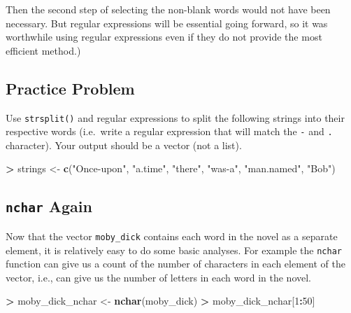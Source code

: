 \documentclass[
]{krantz}
\makeatletter
\newenvironment{Shaded}{\begin{snugshade}}{\end{snugshade}}
\newcommand{\DecValTok}[1]{\textcolor[rgb]{0.06,0.06,0.06}{#1}}
\newcommand{\KeywordTok}[1]{\textcolor[rgb]{0.27,0.27,0.27}{\textbf{#1}}}
\newcommand{\NormalTok}[1]{#1}
\newcommand{\OperatorTok}[1]{\textcolor[rgb]{0.43,0.43,0.43}{\textbf{#1}}}
\newcommand{\StringTok}[1]{\textcolor[rgb]{0.5,0.5,0.5}{#1}}
\newenvironment{kframe}{%
\medskip{}
\setlength{\fboxsep}{.8em}
 \def\at@end@of@kframe{}%
 \ifinner\ifhmode%
  \def\at@end@of@kframe{\end{minipage}}%
  \begin{minipage}{\columnwidth}%
 \fi\fi%
 \def\FrameCommand##1{\hskip\@totalleftmargin \hskip-\fboxsep
 \colorbox{shadecolor}{##1}\hskip-\fboxsep
     \hskip-\linewidth \hskip-\@totalleftmargin \hskip\columnwidth}%
 \MakeFramed {\advance\hsize-\width
   \@totalleftmargin\z@ \linewidth\hsize
   \@setminipage}}%
 {\par\unskip\endMakeFramed%
 \at@end@of@kframe}
\renewenvironment{Shaded}{\begin{kframe}}{\end{kframe}}
\makeatother
\begin{document}
Then the second step of selecting the non-blank words would not have been necessary. But regular expressions will be essential going forward, so it was worthwhile using regular expressions even if they do not provide the most efficient method.)

\hypertarget{practice-problem-14}{%
\subsection{Practice Problem}\label{practice-problem-14}}

Use \texttt{strsplit()} and regular expressions to split the following strings into their respective words (i.e.~write a regular expression that will match the \texttt{-} and \texttt{.} character). Your output should be a vector (not a list).

\begin{Shaded}
\begin{Highlighting}[]
\OperatorTok{\textgreater{}}\StringTok{ }\NormalTok{strings \textless{}{-}}\StringTok{ }\KeywordTok{c}\NormalTok{(}\StringTok{"Once{-}upon"}\NormalTok{, }\StringTok{"a.time"}\NormalTok{, }\StringTok{"there"}\NormalTok{, }\StringTok{"was{-}a"}\NormalTok{, }\StringTok{"man.named"}\NormalTok{, }\StringTok{"Bob"}\NormalTok{)}
\end{Highlighting}
\end{Shaded}

\hypertarget{nchar-again}{%
\subsection{\texorpdfstring{\texttt{nchar} Again}{nchar Again}}\label{nchar-again}}

Now that the vector \texttt{moby\_dick} contains each word in the novel as a separate element, it is relatively easy to do some basic analyses. For example the \texttt{nchar} function can give us a count of the number of characters in each element of the vector, i.e., can give us the number of letters in each word in the novel.

\begin{Shaded}
\begin{Highlighting}[]
\OperatorTok{\textgreater{}}\StringTok{ }\NormalTok{moby\_dick\_nchar \textless{}{-}}\StringTok{ }\KeywordTok{nchar}\NormalTok{(moby\_dick)}
\OperatorTok{\textgreater{}}\StringTok{ }\NormalTok{moby\_dick\_nchar[}\DecValTok{1}\OperatorTok{:}\DecValTok{50}\NormalTok{]}
\end{Highlighting}
\end{Shaded}
\end{document}
